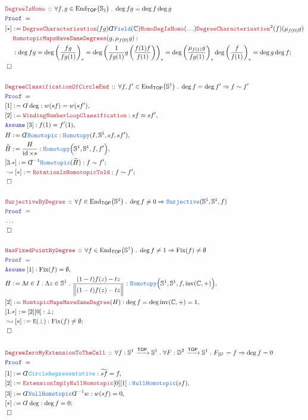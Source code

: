 \documentclass[12pt]{scrartcl}
\newcommand{\TYPE}[1]{\textcolor{NavyBlue}{\mathtt{#1}}}
\newcommand{\FUNC}[1]{\textcolor{Cerulean}{\mathtt{#1}}}
\newcommand{\LOGIC}[1]{\textcolor{Blue}{\mathtt{#1}}}
\newcommand{\THM}[1]{\textcolor{Maroon}{\mathtt{#1}}}
\renewcommand{\.}{\; . \;}
\newcommand{\de}{: \kern 0.1pc =}
\newcommand{\Theorem}[2]{& \THM{#1} \, :: \, #2 \\ & \Proof = \\ }
\newcommand{\NewLine}{\\ & \kern 1pc}
\newcommand{\Page}[1]{ \begin{align*} #1 \end{align*}   }
\newcommand{ \bd }{ \ByDef }
\newcommand{\NoProof}{ & \ldots \\ \EndProof}
\newcommand{\Imply}{\Rightarrow}
\newcommand{\Elim}{\LOGIC{E}}
\newcommand{\Complex}{\mathbb{C}}
\newcommand{\Sphere}{\mathbb{S}}
\DeclareMathOperator*{\id}{id}
\newcommand{\End}{\mathrm{End}}
\newcommand{\Arrow}{\xrightarrow}
\newcommand{\Say}[3]{& #1 \de #2 : #3, \\}
\newcommand{\Conclude}[3]{& #1 \de #2 : #3; \\}
\newcommand{\DeriveConclude}[3]{& \leadsto #1 \de #2 : #3 ; \\}
\newcommand{\Assume}[2]{& \LOGIC{Assume} \; #1 : #2, \\}
\newcommand{\QED}{\; \square}
\newcommand{\EndProof}{& \QED \\}
\newcommand{\ByDef}{\rotatebox[origin=c]{-180}{$D$}}%
\newcommand{\Proof}{\LOGIC{Proof} \; }
\newcommand{\TOP}{\mathsf{TOP}}
\DeclareMathOperator{\Fix}{Fix}
\newcommand{\Field}{\TYPE{Field}}
\begin{document}
\Page{
	\Theorem{DegreeIsHomo}
	{
		\forall f,g \in \End_{\TOP}\big( \Sphere_1 \big) \.
		\deg fg = \deg f \deg g
	}
	\Conclude{[*]}{
		\THM{DegreeCharacterisation}(fg)
		\bd \Field(\Complex)
		\THM{HomoDegIsHomo}(\ldots)
		\THM{DegreeCharacterisation}^2(f)(\mu_{f(0)}g) \NewLine  
		\THM{HomotopicMapsHaveSameDegrees}(g,\mu_{f(0)}g)
	}
	{
		\NewLine :  
		\deg fg = 
		\deg \left( \frac{fg}{fg(1)} \right)_* = 
		\deg \left( \frac{1}{fg(1)} g\left( \frac{f(1)f}{f(1)} \right)\right)_*  =
		\deg \left( \frac{\mu_{f(1)} g}{fg(1)} \right)_* \deg \left( \frac{f}{f(1)} \right)_* =
		\deg g \deg f
	}
	\EndProof
	\\
	\Theorem{DegreeClassificationOfCircleEnd}
	{
		\forall f,f' \in \End_\TOP\big(\Sphere^1\big) \.
		\deg f = \deg f' \Imply f \sim f'
	}
	\Say{[1]}{\bd \deg}{w(sf) = w(sf')}
	\Say{[2]}{\THM{WindingNumberLoopClassification}}{sf \approx sf'}
	\Assume{[3]}{f(1) = f'(1)}
	\Say{H}{\bd \TYPE{Homotopic}}{\TYPE{Homotopy}(I,\Sphere^1,sf,sf')}
	\Say{\widetilde{H}}{\frac{H}{\id \times s}}{\TYPE{Homotopy}\Big(\Sphere^1,\Sphere^1,f,f'\Big)}
	\Conclude{[3.*]}{\bd^{-1} \TYPE{Homotopic}(\widetilde{H})}{f \sim f'}
	\DeriveConclude{[*]}{\THM{RotationIsHomotopicToId}}{f \sim f'}
	\EndProof
	\\
	\Theorem{SurjectiveByDegree}
	{
		\forall f \in \End_\TOP\big(\Sphere^1\big) \.
		\deg f \neq 0 \Imply \TYPE{Surjective}(\Sphere^1,\Sphere^1,f)
	}
	\NoProof
	\\
	\Theorem{HasFixedPointByDegree}
	{
		\forall f \in \End_\TOP\big(\Sphere^1\big) \.
		\deg f \neq 1 \Imply \Fix(f) \neq \emptyset	
	}
	\Assume{[1]}{\Fix(f) = \emptyset}
	\Say{H}{\Lambda t \in I \. \Lambda z \in \Sphere^1 \.  \frac{(1-t)f(z) - tz}{\Big\| (1-t)f(z) - tz \Big\|}}
	{
		\TYPE{Homotopy}\Big(\Sphere^1,\Sphere^1,f,\mathrm{inv}(\Complex,+)\Big)
	}
	\Say{[2]}{\THM{HomtopicMapsHaveSameDegree}(H)}
	{
		\deg f = \deg \mathrm{inv}(\Complex,+) = 1
	}
	\Conclude{[1.*]}{[2][0]}{\bot}
	\DeriveConclude{[*]}{\Elim(\bot)}{\Fix(f) \neq \emptyset}
	\EndProof
	\\
	\Theorem{DegreeZeroByExtensionToTheCell}
	{
		\forall f : \Sphere^1 \Arrow{\TOP} \Sphere^1 \.
		\forall F : \mathbb{D}^2 \Arrow{\TOP} \Sphere^1 \.
		F_{|\Sphere^1} = f \Imply \deg f = 0
	}
	\Say{[1]}{\bd \FUNC{CircleRepresentative}}
	{
		\widetilde{sf} = f
	}
	\Say{[2]}{\THM{ExtensionImplyNullHomotopic}[0][1]}
	{
		\TYPE{NullHomotopic}(sf)
	}
	\Say{[3]}{\bd \TYPE{NullHomotopic} \bd^{-1} w}{w(sf) = 0}
	\Conclude{[*]}{\bd \deg}{\deg f = 0}
	\EndProof
}
\end{document}
